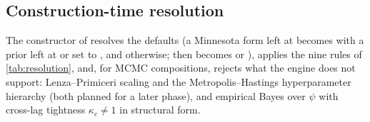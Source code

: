 \subsection{Construction-time resolution}\label{app:resolution}

The constructor of  resolves the  defaults (a Minnesota form left at
 becomes  with a  prior left at  or set to
, and  otherwise;  then becomes  or
), applies the nine rules of \cref{tab:resolution}, and, for MCMC compositions, rejects
what the engine does not support: Lenza--Primiceri scaling and the Metropolis--Hastings
hyperparameter hierarchy (both planned for a later phase), and empirical Bayes over $\psi$ with
cross-lag tightness $\kappa_c \neq 1$ in structural form. %

